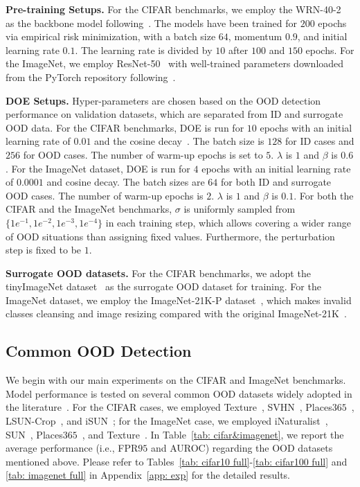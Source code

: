 \documentclass{article} \usepackage{iclr2022_conference,times}
\begin{document}
\textbf{Pre-training Setups.} {For the CIFAR benchmarks, we employ the WRN-40-2~\citep{zagoruyko2016wide} as the backbone model following~\citep{liu2020energy}. The models have been trained for $200$ epochs via empirical risk minimization, with a batch size $64$, momentum $0.9$, and initial learning rate $0.1$. The learning rate is divided by $10$ after $100$ and $150$ epochs. For the ImageNet, we employ ResNet-50~\citep{he2016deep} with well-trained parameters downloaded from the PyTorch repository following~\citep{sun2021react}. }

\textbf{DOE Setups.} {Hyper-parameters are chosen based on the OOD detection performance on validation datasets, which are separated from ID and surrogate OOD data.} For the CIFAR benchmarks, DOE is run for $10$ epochs with an initial learning rate of $0.01$ and the cosine decay~\citep{LoshchilovH17}. The batch size is $128$ for ID cases and $256$ for OOD cases. The number of warm-up epochs is set to $5$. $\lambda$ is $1$ and $\beta$ is $0.6$. For the ImageNet dataset, DOE is run for $4$ epochs with an initial learning rate of $0.0001$ and cosine decay. The batch sizes are $64$ for both ID and surrogate OOD cases. The number of warm-up epochs is $2$.  $\lambda$ is $1$ and $\beta$ is $0.1$. For both the CIFAR and the ImageNet benchmarks, $\sigma$ is uniformly sampled from $\{1e^{-1},1e^{-2},1e^{-3},1e^{-4}\}$ in each training step, which allows covering a wider range of OOD situations than assigning fixed values. Furthermore, the perturbation step is fixed to be $1$. 

\textbf{Surrogate OOD datasets.} For the CIFAR benchmarks, we adopt the  tinyImageNet dataset~\citep{le2015tiny} as the surrogate OOD dataset for training. For the ImageNet dataset, we employ the ImageNet-21K-P dataset~\citep{ridnik2021imagenet}, which makes invalid classes cleansing and image resizing compared with the original ImageNet-21K~\citep{deng2009imagenet}. 



\subsection{Common OOD Detection} \label{sec: far OOD}

We begin with our main experiments on the CIFAR and ImageNet benchmarks. Model performance is tested on several common OOD datasets widely adopted in the literature~\citep{SunM0L22}. For the CIFAR cases, we employed Texture~\citep{cimpoi2014describing}, SVHN~\citep{netzer2011reading}, Places$365$~\citep{ZhouLKO018}, LSUN-Crop~\citep{yu2015lsun}, and iSUN~\citep{xu2015turkergaze}; for the ImageNet case, we employed iNaturalist~\citep{HornASCSSAPB18}, SUN~\citep{xu2015turkergaze}, Places$365$~\citep{ZhouLKO018}, and Texture~\citep{cimpoi2014describing}. In Table~\ref{tab: cifar&imagenet}, we report the average performance (i.e., FPR$95$ and AUROC) regarding the OOD datasets mentioned above. Please refer to Tables~\ref{tab: cifar10 full}-\ref{tab: cifar100 full} and \ref{tab: imagenet full} in Appendix~\ref{app: exp} for the detailed results. 
\end{document}
